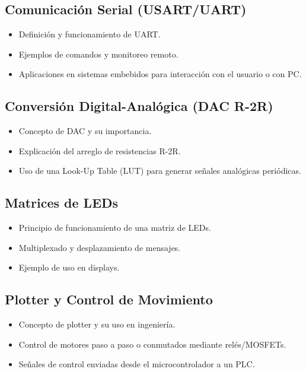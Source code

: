 \subsection{Comunicación Serial (USART/UART)}
\begin{itemize}
    \item Definición y funcionamiento de UART.
    \item Ejemplos de comandos y monitoreo remoto.
    \item Aplicaciones en sistemas embebidos para interacción con el usuario o con PC.
\end{itemize}


\subsection{Conversión Digital-Analógica (DAC R-2R)}
\begin{itemize}
    \item Concepto de DAC y su importancia.
    \item Explicación del arreglo de resistencias R-2R.
    \item Uso de una Look-Up Table (LUT) para generar señales analógicas periódicas.
\end{itemize}


\subsection{Matrices de LEDs}
\begin{itemize}
    \item Principio de funcionamiento de una matriz de LEDs.
    \item Multiplexado y desplazamiento de mensajes.
    \item Ejemplo de uso en displays.
\end{itemize}


\subsection{Plotter y Control de Movimiento}
\begin{itemize}
    \item Concepto de plotter y su uso en ingeniería.
    \item Control de motores paso a paso o conmutados mediante relés/MOSFETs.
    \item Señales de control enviadas desde el microcontrolador a un PLC.
\end{itemize}
